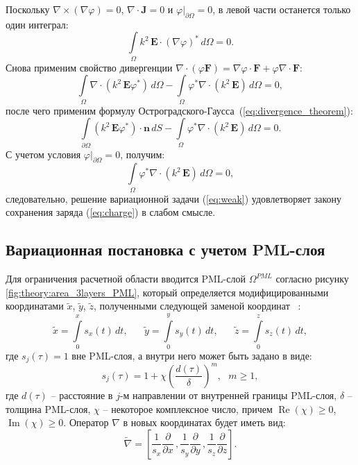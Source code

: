 \documentclass[a4paper,14pt]{article}
\renewcommand{\Re}{\mathop{\mathrm{Re}}\nolimits}
\renewcommand{\Im}{\mathop{\mathrm{Im}}\nolimits}
\begin{document}
Поскольку $\nabla \times (\nabla \varphi) = 0$, $\nabla \cdot \mathbf{J} = 0$ и $\left. \varphi \right | _{\partial \Omega} = 0$, в левой части останется только один интеграл:
\begin{equation*}
	\int\limits_\Omega k^{2}\, \mathbf{E} \cdot (\nabla \varphi)^{*} \,d\Omega = 0 .
\end{equation*}
Снова применим свойство дивергенции $\nabla \cdot (\varphi \mathbf{F}) = \nabla \varphi \cdot \mathbf{F} + \varphi \nabla \cdot \mathbf{F}$:
\begin{equation*}
	\int\limits_\Omega \nabla \cdot ( k^{2}\, \mathbf{E} \varphi^{*} ) \,d\Omega
	- \int\limits_\Omega \varphi^{*} \nabla \cdot ( k^{2}\, \mathbf{E} ) \,d\Omega = 0 ,
\end{equation*}
после чего применим формулу Остроградского-Гаусса~(\ref{eq:divergence_theorem}):
\begin{equation*}
	\int\limits_{\partial \Omega} ( k^{2}\, \mathbf{E} \varphi^{*} ) \cdot \mathbf{n} \,d S
	- \int\limits_\Omega \varphi^{*} \nabla \cdot ( k^{2}\, \mathbf{E} ) \,d\Omega = 0 .
\end{equation*}
С учетом условия $\left. \varphi \right | _{\partial \Omega} = 0$, получим:
\begin{equation*}
	\int\limits_\Omega \varphi^{*} \nabla \cdot ( k^{2}\, \mathbf{E} ) \,d\Omega = 0 ,
\end{equation*}
следовательно, решение вариационной задачи (\ref{eq:weak}) удовлетворяет закону сохранения заряда (\ref{eq:charge}) в слабом смысле.


\subsection{Вариационная постановка с учетом PML-слоя}
Для ограничения расчетной области вводится PML-слой ${\Omega^{PML}}$ согласно рисунку \ref{fig:theory:area_3layers_PML}, который определяется модифицированными координатами $\tilde{x}$, $\tilde{y}$, $\tilde{z}$, полученными следующей заменой координат ~\citep{wiik_dehoop_ursin}:
\begin{equation*}
	\tilde{x} = \int\limits_0^x s_x (t) \,dt ,
	\text{~~~~~}
	\tilde{y} = \int\limits_0^y s_y (t) \,dt ,
	\text{~~~~~}
	\tilde{z} = \int\limits_0^z s_z (t) \,dt ,
\end{equation*}
где $s_j(\tau) = 1$ вне PML-слоя, а внутри него может быть задано в виде:
\begin{equation}
	s_j(\tau) = 1 + \chi \left( \frac{d(\tau)}{\delta} \right)^m , \text{~~} m \geq 1 ,
	\label{eq:pml_s}
\end{equation}
где $d(\tau)$ -- расстояние в $j$-м направлении от внутренней границы PML-слоя, $\delta$ -- толщина PML-слоя, $\chi$ -- некоторое комплексное число, причем $\Re(\chi) \ge 0$, $\Im(\chi) \ge 0$. Оператор $\nabla$ в новых координатах будет иметь вид:
\begin{equation*}
	\tilde{\nabla} = \left[ \frac{1}{s_x} \frac{\partial}{\partial x} \,, \frac{1}{s_y} \frac{\partial}{\partial y} \,, \frac{1}{s_z} \frac{\partial}{\partial z} \right] .
\end{equation*}
\end{document}
